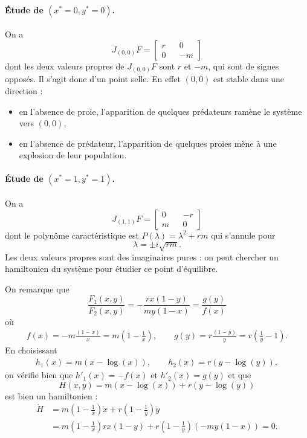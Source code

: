 \paragraph*{\'Etude de $(x^* = 0, y^* = 0)$.}
On a 
$$
J_{(0, 0)}F = 
  \left[\begin{array}{rcr} 
    r  & & 0 \\
    0 & & -m 
  \end{array}\right]
$$
dont les deux valeurs propres de $J_{(0, 0)}F$ sont $r$ et $-m$, qui sont de signes opposés. Il s'agit donc d'un point selle. En effet $(0, 0)$ est stable dans une direction : 
\begin{itemize}
  \item en l'absence de proie, l'apparition de quelques prédateurs ramène le système vers $(0, 0)$, 
  \item en l'absence de prédateur, l'apparition de quelques proies mène à une explosion de leur population.
\end{itemize}
  
\paragraph*{\'Etude de $(x^* = 1, y^* = 1)$.}
On a 
$$
J_{(1, 1)}F = 
  \left[\begin{array}{rcr} 
    0 & & -r  \\
    m  & & 0
  \end{array}\right]
$$
dont le polynôme caractéristique est $P(\lambda) = \lambda^2 + rm$ qui s'annule pour
$$
\lambda = \pm i \sqrt{rm}.
$$
Les deux valeurs propres sont des imaginaires pures : on peut chercher un hamiltonien du système pour étudier ce point d'équilibre.

\bigskip
On remarque que 
$$
\frac{F_1(x, y)}{F_2(x, y)} = -\frac{rx(1-y)}{my(1-x)} = \frac{g(y)}{f(x)}
$$
où
\begin{align*}
f(x) = -m \frac{(1-x)}{x} = m \left(1 - \frac1x\right), \qquad
g(y) = r \frac{(1-y)}{y} = r \left(\frac1y - 1\right).
\end{align*}
En choisissant 
\begin{align*}
  h_1(x) = m(x-\log(x)), \qquad h_2(x) = r(y-\log(y)),
\end{align*}
on vérifie bien que $h'_1(x) = -f(x)$ et $h'_2(x) = g(y)$ et que 
$$
H(x, y) = m(x-\log(x)) + r(y-\log(y))
$$
est bien un hamiltonien : 
\begin{align*}
\dot H 
& = m\left(1 - \frac1x\right) \dot x + r \left(1 - \frac1y\right) \dot y \\
& = m\left(1 - \frac1x\right) r x (1 - y) + r \left(1 - \frac1y\right) (- m y (1 - x)) 
= 0.
\end{align*}

